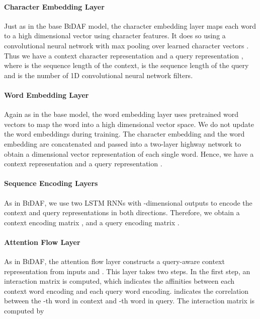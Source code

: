 \documentclass[11pt,letterpaper]{article}
\begin{document}
\paragraph{Character Embedding Layer} Just as in the base \textsc{BiDAF} model, the character embedding layer maps each word to a high dimensional vector using character features. It does so using a convolutional neural network with max pooling over learned character vectors  \cite{Fully_CharCNN_NMT_Lee:2016wl, Kim:2016vh}. Thus we have a context character representation  and a query representation , where  is the sequence length of the context,  is the sequence length of the query and  is the number of 1D convolutional neural network filters.

\paragraph{Word Embedding Layer} Again as in the base model, the word embedding layer uses pretrained word vectors \citep[the 6B GloVe vectors of ][]{glove_Pennington:2014jd} to map the word into a high dimensional vector space. We do not update the word embeddings during training. The character embedding and the word embedding are concatenated and passed into a two-layer highway network \cite{Highway_network_2015arXiv150500387S} to obtain a  dimensional vector representation of each single word. Hence, we have a context representation  and a query representation .

\paragraph{Sequence Encoding Layers}  As in \textsc{BiDAF}, we use two LSTM RNNs \cite{LSTM_Hochreiter1997} with -dimensional outputs to encode the context and query representations in both directions. Therefore, we obtain a context encoding matrix , and a query encoding matrix .

\paragraph{Attention Flow Layer} As in \textsc{BiDAF}, the attention flow layer constructs a query-aware context representation  from inputs  and . 
This layer takes two steps. In the first step, an interaction matrix  is computed, which indicates the affinities between each context word encoding and each query word encoding.  indicates the correlation between the -th word in context and -th word in query. The interaction matrix is computed by
\end{document}
